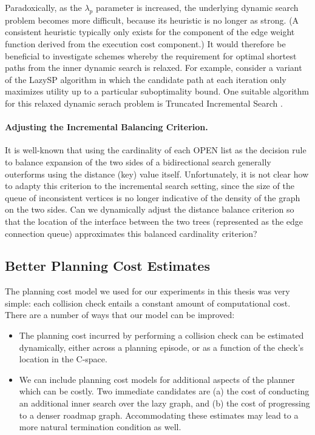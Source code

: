 Paradoxically,
as the $\lambda_p$ parameter is increased,
the underlying dynamic search problem becomes more difficult,
because its heuristic is no longer as strong.
(A consistent heuristic typically only exists for the component of
the edge weight function derived from the execution cost component.)
It would therefore be beneficial to investigate schemes whereby
the requirement for optimal shortest paths from the inner
dynamic search is relaxed.
For example,
consider a variant of the LazySP algorithm
in which the candidate path at each iteration only maximizes utility
up to a particular suboptimality bound. 
One suitable algorithm for this relaxed dynamic serach problem
is Truncated Incremental Search \citep{aine2016truncatedincremental}.

\paragraph{Adjusting the Incremental Balancing Criterion.}
It is well-known \citep{pohl1969bidirectional}
that using the cardinality of each OPEN list as the decision rule
to balance expansion of the two sides of a bidirectional search
generally outerforms using the distance (key) value itself.
Unfortunately,
it is not clear how to adapty this criterion to the incremental
search setting,
since the size of the queue of inconsistent vertices is no longer
indicative of the density of the graph on the two sides.
Can we dynamically adjust the distance balance criterion
so that the location of the interface between the two trees
(represented as the edge connection queue)
approximates this balanced cardinality criterion?

\subsection{Better Planning Cost Estimates}

The planning cost model we used for our experiments in this thesis
was very simple:
each collision check entails a constant amount of computational cost.
There are a number of ways that our model can be improved:
\begin{itemize}
\item The planning cost incurred by performing a collision check
   can be estimated dynamically,
   either across a planning episode,
   or as a function of the check's location in the C-space.
\item We can include planning cost models for additional aspects of
   the planner which can be costly.
   Two immediate candidates are
   (a) the cost of conducting an additional inner search
   over the lazy graph,
   and (b) the cost of progressing to a denser roadmap graph.
   Accommodating these estimates may lead to a more natural
   termination condition as well.
\end{itemize}

